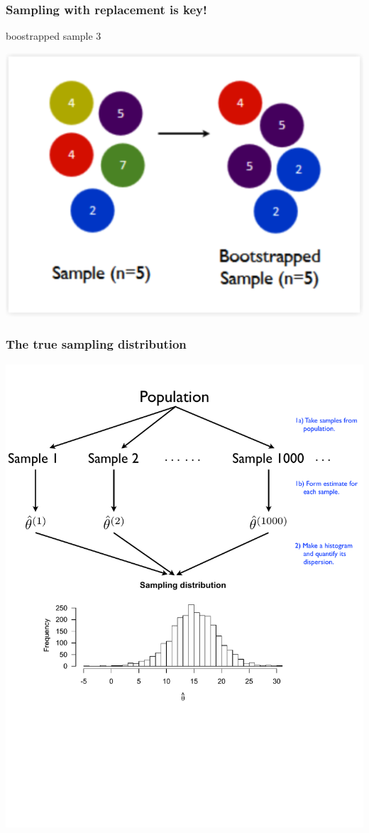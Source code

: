 \documentclass{beamer}
\newcommand{\sk}{\vspace{.5cm}}
\begin{document}
\begin{frame}
	\frametitle{Sampling with replacement is key!}
	
	boostrapped sample 3 \sk
	\begin{center}
		\includegraphics[scale=0.4]{figures/bs3}
	\end{center}

\end{frame}


\begin{frame}
	\frametitle{The true sampling distribution}
	\begin{center}
	\includegraphics[scale=0.42]{figures/samplingdistribution_schematic}		
	\end{center}
\end{frame}
\end{document}
